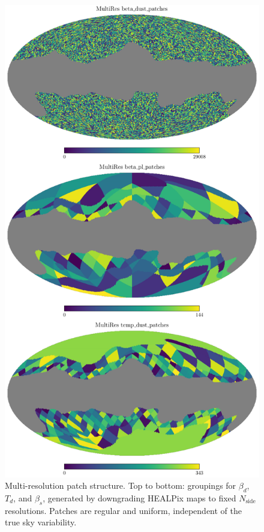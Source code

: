 \documentclass[%
 reprint,
bibnotes,
 amsmath,amssymb,
 aps,
floatfix, 
]{revtex4-2}
\begin{document}
\begin{figure}[H]
    \centering
    \includegraphics[width=\linewidth]{figures/multires_patch_layout.pdf}
    \caption{
    Multi-resolution patch structure.
    Top to bottom: groupings for \( \beta_d \), \( T_d \), and \( \beta_s \), generated by downgrading HEALPix maps to fixed \( N_{\text{side}} \) resolutions.
    Patches are regular and uniform, independent of the true sky variability.
    }
    \label{fig:multires_patches}
\end{figure}
\end{document}
